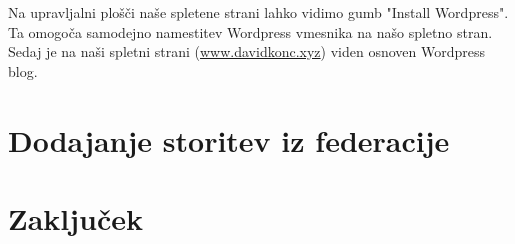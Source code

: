 \documentclass[a4paper,12pt,openright]{book}
\begin{document}
Na upravljalni plošči naše spletene strani lahko vidimo gumb "Install Wordpress". Ta omogoča samodejno namestitev Wordpress vmesnika na našo spletno stran. Sedaj je na naši spletni strani (\href{www.davidkonc.xyz}{www.davidkonc.xyz}) viden osnoven Wordpress blog.

\chapter{Dodajanje storitev iz federacije}

\chapter{Zaključek}



\cleardoublepage

\printbibliography[heading=bibintoc,type=article,title={Članki v revijah}]

\printbibliography[heading=bibintoc,type=inproceedings,title={Članki v zbornikih}]

\printbibliography[heading=bibintoc,type=incollection,title={Poglavja v knjigah}]

\printbibliography[heading=bibintoc,title={Celotna literatura}]
\end{document}
